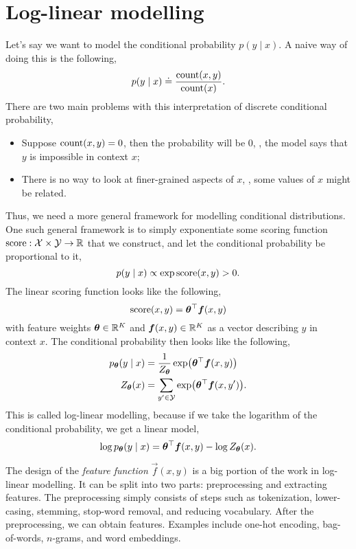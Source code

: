 \section{Log-linear modelling} \label{sec:log-linear-modelling}

Let's say we want to model the conditional probability $p(y\mid x)$. A naive
way of doing this is the following, \[
  p(y\mid x) \doteq \frac{\mathrm{count}(x,y)}{\mathrm{count}(x)}
.\]
There are two main problems with this interpretation of discrete conditional
probability,
\begin{itemize}
  \item Suppose $\mathrm{count}(x,y)=0$, then the probability will be $0$, \ie,
    the model says that $y$ is impossible in context $x$;
  \item There is no way to look at finer-grained aspects of $x$, \ie, some
    values of $x$ might be related.
\end{itemize}

Thus, we need a more general framework for modelling conditional distributions.
One such general framework is to simply exponentiate some scoring function
$\mathrm{score}: \mathcal{X} \times \mathcal{Y} \to \mathbb{R}$ that we construct, and let the conditional
probability be proportional to it, \[
  p(y\mid x) \propto \exp \mathrm{score}(x, y) > 0
.\]
The linear scoring function looks like the following, \[
  \mathrm{score}(x,y) = \bm{\theta}^\top \bm{f}(x, y)
\]
with feature weights $\bm{\theta}\in\mathbb{R}^K$ and $\bm{f}(x,y)\in\mathbb{R}^K$ as a
vector describing $y$ in context $x$. The conditional probability then looks
like the following,
\begin{align*}
  p_{\vec{\theta}}(y\mid x) &= \frac{1}{Z_{\vec{\theta}}} \exp \lft( \transpose{\vec{\theta}} \vec{f}(x,y) \rgt) \\
  Z_{\vec{\theta}}(x) &= \sum_{y'\in\mathcal{Y}} \exp \lft( \transpose{\vec{\theta}} \vec{f}(x,y') \rgt)
.\end{align*}
This is called log-linear modelling, because if we take the logarithm of the
conditional probability, we get a linear model, \[
  \log p_{\bm{\theta}}(y \mid x) = \bm{\theta}^\top \bm{f}(x,y) - \log Z_{\bm{\theta}}(x)
.\]

The design of the \textit{feature function} $\vec{f}(x,y)$ is a big portion of
the work in log-linear modelling. It can be split into two parts: preprocessing
and extracting features. The preprocessing simply consists of steps such as tokenization,
lower-casing, stemming, stop-word removal, and reducing vocabulary. After the
preprocessing, we can obtain features. Examples include one-hot encoding,
bag-of-words, $n$-grams, and word embeddings.

